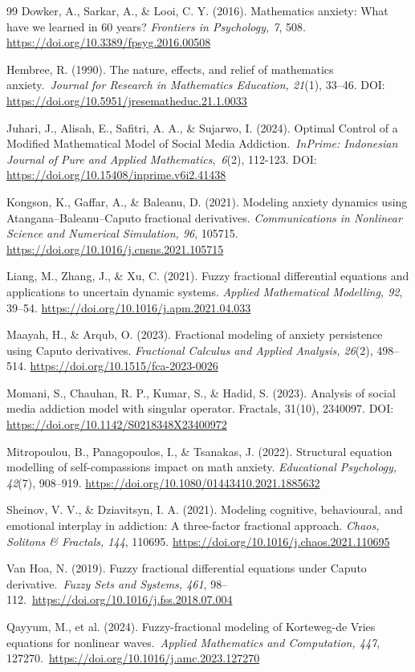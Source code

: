 \documentclass[10pt]{NSP1}
\begin{document}
\begin{thebibliography}{99}
Dowker, A., Sarkar, A., \& Looi, C. Y. (2016). Mathematics anxiety: What have we learned in 60 years? \emph{Frontiers in Psychology, 7}, 508. \url{https://doi.org/10.3389/fpsyg.2016.00508}

Hembree, R. (1990). The nature, effects, and relief of mathematics anxiety.~\emph{Journal for Research in Mathematics Education, 21}(1), 33--46. DOI: \url{https://doi.org/10.5951/jresematheduc.21.1.0033}

Juhari, J., Alisah, E., Safitri, A. A., \& Sujarwo, I. (2024). Optimal Control of a Modified Mathematical Model of Social Media Addiction.~\emph{InPrime: Indonesian Journal of Pure and Applied Mathematics},~\emph{6}(2), 112-123. DOI: \url{https://doi.org/10.15408/inprime.v6i2.41438}

Kongson, K., Gaffar, A., \& Baleanu, D. (2021). Modeling anxiety dynamics using Atangana--Baleanu--Caputo fractional derivatives. \emph{Communications in Nonlinear Science and Numerical Simulation, 96}, 105715. \url{https://doi.org/10.1016/j.cnsns.2021.105715}

Liang, M., Zhang, J., \& Xu, C. (2021). Fuzzy fractional differential equations and applications to uncertain dynamic systems. \emph{Applied Mathematical Modelling, 92}, 39--54. \url{https://doi.org/10.1016/j.apm.2021.04.033}

Maayah, H., \& Arqub, O. (2023). Fractional modeling of anxiety persistence using Caputo derivatives. \emph{Fractional Calculus and Applied Analysis, 26}(2), 498--514. \url{https://doi.org/10.1515/fca-2023-0026}

Momani, S., Chauhan, R. P., Kumar, S., \& Hadid, S. (2023). Analysis of social media addiction model with singular operator. Fractals, 31(10), 2340097. DOI: \url{https://doi.org/10.1142/S0218348X23400972}

Mitropoulou, B., Panagopoulos, I., \& Tsanakas, J. (2022). Structural equation modelling of self-compassion\textquotesingle s impact on math anxiety. \emph{Educational Psychology, 42}(7), 908--919. \url{https://doi.org/10.1080/01443410.2021.1885632}

Sheinov, V. V., \& Dziavitsyn, I. A. (2021). Modeling cognitive, behavioural, and emotional interplay in addiction: A three-factor fractional approach. \emph{Chaos, Solitons \& Fractals, 144}, 110695. \url{https://doi.org/10.1016/j.chaos.2021.110695}

Van Hoa, N. (2019). Fuzzy fractional differential equations under Caputo derivative.~\emph{Fuzzy Sets and Systems, 461}, 98--112.~\url{https://doi.org/10.1016/j.fss.2018.07.004}

Qayyum, M., et al. (2024). Fuzzy-fractional modeling of Korteweg-de Vries equations for nonlinear waves.~\emph{Applied Mathematics and Computation, 447}, 127270.~\url{https://doi.org/10.1016/j.amc.2023.127270}

\end{thebibliography}
\end{document}
